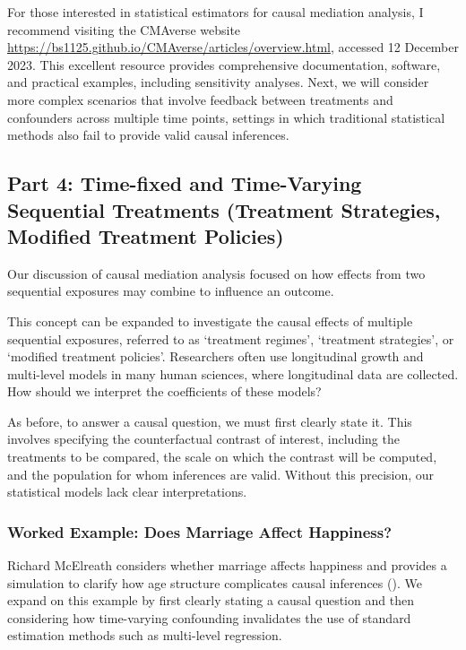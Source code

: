 \documentclass[
  single column]{article}
\begin{document}
For those interested in statistical estimators for causal mediation
analysis, I recommend visiting the CMAverse website
\url{https://bs1125.github.io/CMAverse/articles/overview.html}, accessed
12 December 2023. This excellent resource provides comprehensive
documentation, software, and practical examples, including sensitivity
analyses. Next, we will consider more complex scenarios that involve
feedback between treatments and confounders across multiple time points,
settings in which traditional statistical methods also fail to provide
valid causal inferences.

\subsection{Part 4: Time-fixed and Time-Varying Sequential Treatments
(Treatment Strategies, Modified Treatment Policies)}\label{id-sec-4}

Our discussion of causal mediation analysis focused on how effects from
two sequential exposures may combine to influence an outcome.

This concept can be expanded to investigate the causal effects of
multiple sequential exposures, referred to as `treatment regimes',
`treatment strategies', or `modified treatment policies'. Researchers
often use longitudinal growth and multi-level models in many human
sciences, where longitudinal data are collected. How should we interpret
the coefficients of these models?

As before, to answer a causal question, we must first clearly state it.
This involves specifying the counterfactual contrast of interest,
including the treatments to be compared, the scale on which the contrast
will be computed, and the population for whom inferences are valid.
Without this precision, our statistical models lack clear
interpretations.

\subsubsection{Worked Example: Does Marriage Affect
Happiness?}\label{worked-example-does-marriage-affect-happiness}

Richard McElreath considers whether marriage affects happiness and
provides a simulation to clarify how age structure complicates causal
inferences ().
We expand on this example by first clearly stating a causal question and
then considering how time-varying confounding invalidates the use of
standard estimation methods such as multi-level regression.
\end{document}
